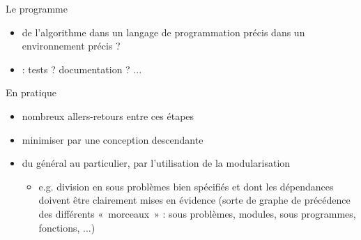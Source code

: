 \documentclass[aspectratio=1610,francais,envcountsect]{beamer}
\begin{document}
\begin{frame}[allowframebreaks]
  \framebreak

  \begin{block}{Le programme}
    \begin{itemize}
    \item {} de l'algorithme dans un langage de
      programmation précis dans un environnement précis ?
    \item {} : tests ?  documentation ? ...
    \end{itemize}
  \end{block}

  \framebreak

  \begin{exampleblock}{En pratique}
    \begin{itemize}
    \item nombreux allers-retours entre ces étapes
    \item minimiser par une conception descendante
    \item du général au particulier, par l'utilisation de la
      modularisation
    
      \begin{itemize}
      \item e.g. division en sous problèmes bien spécifiés et dont les
        dépendances doivent être clairement mises en évidence (sorte
        de graphe de précédence des différents «~morceaux~» : sous
        problèmes, modules, sous programmes, fonctions, ...)
      \end{itemize}
    \end{itemize}
  \end{exampleblock}

\end{frame}
\end{document}
